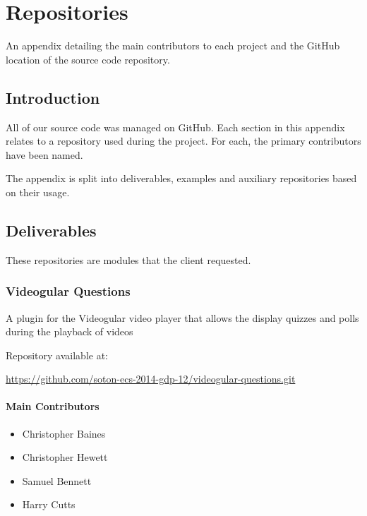 \chapter{Repositories} \label{App:Repositories}

An appendix detailing the main contributors to each project and the GitHub location of the source code repository.

\begin{preamble}
\end{preamble}

\section{Introduction}

All of our source code was managed on GitHub. Each section in this appendix relates to a repository used during the project. For each, the primary contributors have been named.

The appendix is split into deliverables, examples and auxiliary repositories based on their usage.

\section{Deliverables}

These repositories are modules that the client requested.

\subsection{Videogular Questions}
\label{Section:Repo_videogular_questions}

A plugin for the \gls{Videogular} video player that allows the display quizzes and polls during the playback of videos

Repository available at:

\url{https://github.com/soton-ecs-2014-gdp-12/videogular-questions.git}

\subsubsection{Main Contributors}
\begin{itemize}
  \item Christopher Baines
  \item Christopher Hewett
  \item Samuel Bennett
  \item Harry Cutts
\end{itemize}

